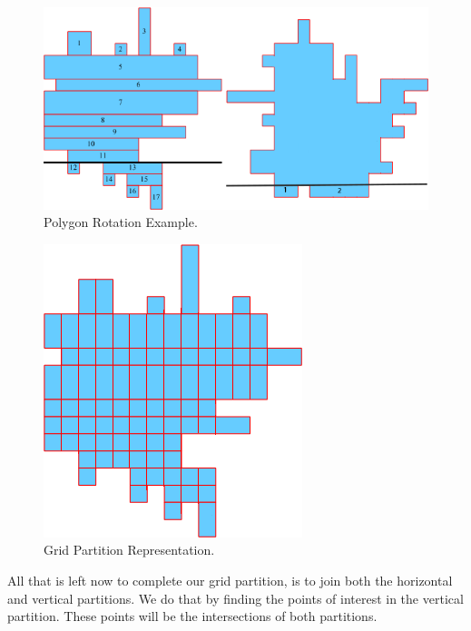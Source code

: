 \documentclass[12pt,a4paper,oneside]{article}
\begin{document}
\begin{figure}[h!]
  \centering \includegraphics[scale=0.5]{rotatedPoly.png}
  \caption{Polygon Rotation Example.}
  \label{fig:rot}
\end{figure}

\begin{figure}[h!]
  \centering \includegraphics[scale=0.5]{gridPartition.png}
  \caption{Grid Partition Representation.}
  \label{fig:grid}
\end{figure}

All that is left now to complete our grid partition, is to join both the horizontal and vertical partitions. We do that by finding the points of interest in the vertical partition. These points will be the intersections of both partitions.
\end{document}
